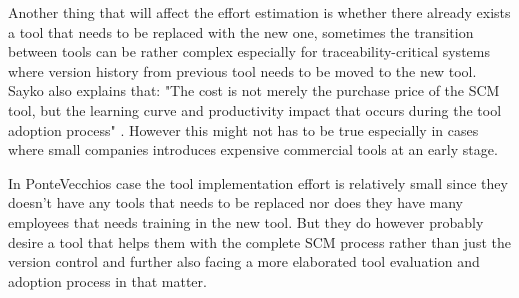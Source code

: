 \documentclass[10pt]{article}
\begin{document}
\noindent Another thing that will affect the effort estimation is whether there already exists a tool that needs to be replaced with the new one, sometimes the transition between tools can be rather complex especially for traceability-critical systems where version history from previous tool needs to be moved to the new tool. Sayko also explains that: "The cost is not merely the purchase price of the SCM tool, but the learning curve and productivity impact that occurs during the tool adoption process" \cite{Sayko}. However this might not has to be true especially in cases where small companies introduces expensive commercial tools at an early stage.

\noindent In PonteVecchios case the tool implementation effort is relatively small since they doesn't have any tools that needs to be replaced nor does they have many employees that needs training in the new tool. But they do however probably desire a tool that helps them with the complete SCM process rather than just the version control and further also facing a more elaborated tool evaluation and adoption process in that matter.
\end{document}
